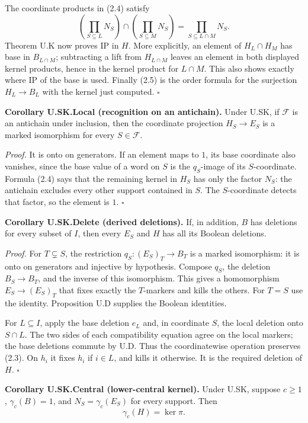 \documentclass[
  11pt,
  a4paper,
]{article}
\begin{document}
The coordinate products in (2.4) satisfy \[
\left(\prod_{S\subseteq L}N_S\right)\cap
\left(\prod_{S\subseteq M}N_S\right)
=\prod_{S\subseteq L\cap M}N_S.
\] Theorem U.K now proves IP in \(H\). More explicitly, an element of
\(H_L\cap H_M\) has base in \(B_{L\cap M}\); subtracting a lift from
\(H_{L\cap M}\) leaves an element in both displayed kernel products,
hence in the kernel product for \(L\cap M\). This also shows exactly
where IP of the base is used. Finally (2.5) is the order formula for the
surjection \(H_L\to B_L\) with the kernel just computed. \(\square\)

\textbf{Corollary U.SK.Local (recognition on an antichain).} Under U.SK,
if \(\mathcal F\) is an antichain under inclusion, then the coordinate
projection \(H_S\to E_S\) is a marked isomorphism for every
\(S\in\mathcal F\).

\emph{Proof.} It is onto on generators. If an element maps to \(1\), its
base coordinate also vanishes, since the base value of a word on \(S\)
is the \(q_S\)-image of its \(S\)-coordinate. Formula (2.4) says that
the remaining kernel in \(H_S\) has only the factor \(N_S\): the
antichain excludes every other support contained in \(S\). The
\(S\)-coordinate detects that factor, so the element is \(1\).
\(\square\)

\textbf{Corollary U.SK.Delete (derived deletions).} If, in addition,
\(B\) has deletions for every subset of \(I\), then every \(E_S\) and
\(H\) has all its Boolean deletions.

\emph{Proof.} For \(T\subsetneq S\), the restriction
\(q_S:(E_S)_T\to B_T\) is a marked isomorphism: it is onto on generators
and injective by hypothesis. Compose \(q_S\), the deletion
\(B_S\to B_T\), and the inverse of this isomorphism. This gives a
homomorphism \(E_S\to(E_S)_T\) that fixes exactly the \(T\)-markers and
kills the others. For \(T=S\) use the identity. Proposition U.D supplies
the Boolean identities.

For \(L\subseteq I\), apply the base deletion \(e_L\) and, in coordinate
\(S\), the local deletion onto \(S\cap L\). The two sides of each
compatibility equation agree on the local markers; the base deletions
commute by U.D. Thus the coordinatewise operation preserves (2.3). On
\(h_i\) it fixes \(h_i\) if \(i\in L\), and kills it otherwise. It is
the required deletion of \(H\). \(\square\)

\textbf{Corollary U.SK.Central (lower-central kernel).} Under U.SK,
suppose \(c\geq1\), \(\gamma_c(B)=1\), and \(N_S=\gamma_c(E_S)\) for
every support. Then \[
\gamma_c(H)=\ker\pi.
\tag{2.6}
\]
\end{document}
